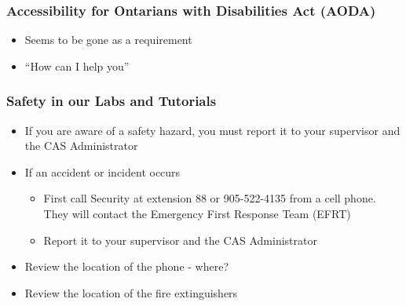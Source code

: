 \documentclass[handout]{beamer} %
\begin{document}

\begin{frame}
\frametitle{Accessibility for Ontarians with Disabilities Act (AODA)}

\begin{itemize}
\item Seems to be gone as a requirement
\item ``How can I help you''
\end{itemize}

\end{frame}


\begin{frame}
\frametitle{Safety in our Labs and Tutorials}

\begin{itemize}

\item If you are aware of a safety hazard, you must report it to your supervisor
  and the CAS Administrator
\item If an accident or incident occurs
\begin{itemize}
\item First call Security at extension 88 or 905-522-4135 from a cell phone.
  They will contact the Emergency First Response Team (EFRT)
\item Report it to your supervisor and the CAS Administrator
\end{itemize}
\item Review the location of the phone - where?
\item Review the location of the fire extinguishers
\end{itemize}

\end{frame}



\end{document}
